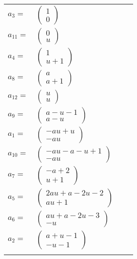 \documentclass[1p]{elsarticle_modified}
\theoremstyle{definition}
\begin{document}
\begin{tabular}{m{7pt} m{180pt} m{7pt} m{180pt} }
\flushright $a_{3}=$&$\begin{pmatrix}1\\0\end{pmatrix}$ \\
\flushright $a_{11}=$&$\begin{pmatrix}0\\u\end{pmatrix}$ \\
\flushright $a_{4}=$&$\begin{pmatrix}1\\u+1\end{pmatrix}$ \\
\flushright $a_{8}=$&$\begin{pmatrix}a\\a+1\end{pmatrix}$ \\
\flushright $a_{12}=$&$\begin{pmatrix}u\\u\end{pmatrix}$ \\
\flushright $a_{9}=$&$\begin{pmatrix}a- u-1\\a- u\end{pmatrix}$ \\
\flushright $a_{1}=$&$\begin{pmatrix}- a u+u\\- a u\end{pmatrix}$ \\
\flushright $a_{10}=$&$\begin{pmatrix}- a u- a- u+1\\- a u\end{pmatrix}$ \\
\flushright $a_{7}=$&$\begin{pmatrix}- a+2\\u+1\end{pmatrix}$ \\
\flushright $a_{5}=$&$\begin{pmatrix}2 a u+a-2 u-2\\a u+1\end{pmatrix}$ \\
\flushright $a_{6}=$&$\begin{pmatrix}a u+a-2 u-3\\- u\end{pmatrix}$ \\
\flushright $a_{2}=$&$\begin{pmatrix}a+u-1\\- u-1\end{pmatrix}$\\&\end{tabular}
\end{document}
